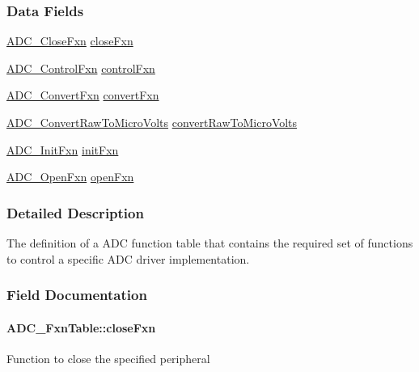 \subsubsection*{Data Fields}
\begin{DoxyCompactItemize}
\item 
\hyperlink{_a_d_c_8h_a42f6ff234d06fb71647510e04be8a3bf}{A\+D\+C\+\_\+\+Close\+Fxn} \hyperlink{struct_a_d_c___fxn_table_ae7aebe8cc8f3493502e3dceecb688c32}{close\+Fxn}
\item 
\hyperlink{_a_d_c_8h_af9c178e22b377d9cf5eb7d2a1a072f12}{A\+D\+C\+\_\+\+Control\+Fxn} \hyperlink{struct_a_d_c___fxn_table_af92f7867301c8edd125436ca66e16877}{control\+Fxn}
\item 
\hyperlink{_a_d_c_8h_a552f2f752fbfc1b2af7551e55e392a42}{A\+D\+C\+\_\+\+Convert\+Fxn} \hyperlink{struct_a_d_c___fxn_table_ac7255105d1eca815a45714ff0d2186cd}{convert\+Fxn}
\item 
\hyperlink{_a_d_c_8h_ab1b64068b8e0e3a26fa4b470cff92bf7}{A\+D\+C\+\_\+\+Convert\+Raw\+To\+Micro\+Volts} \hyperlink{struct_a_d_c___fxn_table_a9f99de002ca85c6aae274dd4c23de61a}{convert\+Raw\+To\+Micro\+Volts}
\item 
\hyperlink{_a_d_c_8h_af5f90e5268e88d0bb56d40d53542b1da}{A\+D\+C\+\_\+\+Init\+Fxn} \hyperlink{struct_a_d_c___fxn_table_a5b2882d28b0e4a8c8d7bb2ed741380e8}{init\+Fxn}
\item 
\hyperlink{_a_d_c_8h_a753af5a6a07905e109bbdecb785ac44d}{A\+D\+C\+\_\+\+Open\+Fxn} \hyperlink{struct_a_d_c___fxn_table_aa74579528b7be192281bf5c23e6dcf03}{open\+Fxn}
\end{DoxyCompactItemize}


\subsubsection{Detailed Description}
The definition of a A\+D\+C function table that contains the required set of functions to control a specific A\+D\+C driver implementation. 

\subsubsection{Field Documentation}
\paragraph[{close\+Fxn}]{ A\+D\+C\+\_\+\+Fxn\+Table\+::close\+Fxn}\label{struct_a_d_c___fxn_table_ae7aebe8cc8f3493502e3dceecb688c32}
Function to close the specified peripheral 
